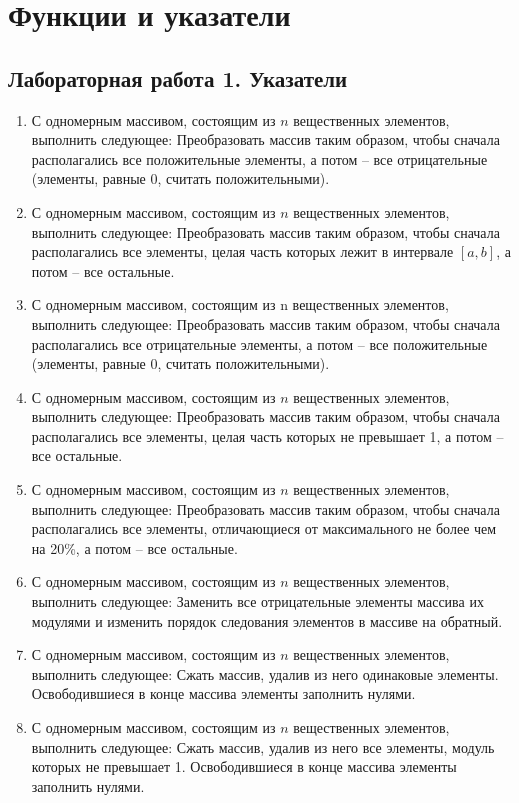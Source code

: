 \chapter{Функции и указатели}
\section{Лабораторная работа 1. Указатели}
\begin{enumerate}[leftmargin=*]
    \item С одномерным массивом, состоящим из $n$ вещественных элементов, выполнить следующее: Преобразовать массив таким образом, чтобы сначала располагались все положительные элементы, а потом – все отрицательные (элементы, равные 0, считать положительными).
    \item С одномерным массивом, состоящим из $n$ вещественных элементов, выполнить следующее: Преобразовать массив таким образом, чтобы сначала располагались все элементы, целая часть которых лежит в интервале $[a,b]$, а потом – все остальные.
    \item С одномерным массивом, состоящим из n вещественных элементов, выполнить следующее: Преобразовать массив таким образом, чтобы сначала располагались все отрицательные элементы, а потом – все положительные (элементы, равные 0, считать положительными).
    \item С одномерным массивом, состоящим из $n$ вещественных элементов, выполнить следующее: Преобразовать массив таким образом, чтобы сначала располагались все элементы, целая часть которых не превышает 1, а потом – все остальные.
    \item С одномерным массивом, состоящим из $n$ вещественных элементов, выполнить следующее: Преобразовать массив таким образом, чтобы сначала располагались все элементы, отличающиеся от максимального не более чем на 20\%, а потом – все остальные.
    \item С одномерным массивом, состоящим из $n$ вещественных элементов, выполнить следующее: Заменить все отрицательные элементы массива их модулями и изменить порядок следования элементов в массиве на обратный.
    \item С одномерным массивом, состоящим из $n$ вещественных элементов, выполнить следующее: Сжать массив, удалив из него одинаковые элементы.  Освободившиеся в конце массива элементы заполнить нулями.
    \item С одномерным массивом, состоящим из $n$ вещественных элементов, выполнить следующее: Сжать массив, удалив из него все элементы, модуль которых не превышает 1.  Освободившиеся в конце массива элементы заполнить нулями.

\end{enumerate}
